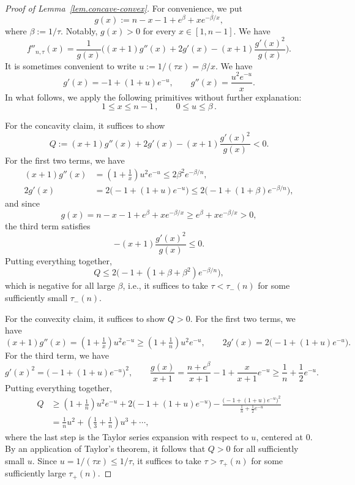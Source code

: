 \documentclass[10pt,a4paper]{amsart}
\begin{document}
\begin{proof}[Proof of Lemma~\ref{lem.concave-convex}]
For convenience, we put
\[
g(x)
:=n-x-1+e^{\beta}+xe^{-\beta/x},
\]
where $\beta:=1/\tau$.
Notably, $g(x)>0$ for every $x\in[1,n-1]$.
We have
\[
f''_{n,\tau}(x)
=\frac{1}{g(x)}\bigg((x+1)g''(x)+2g'(x)-(x+1)\frac{g'(x)^2}{g(x)}\bigg).
\]
It is sometimes convenient to write $u:=1/(\tau x)=\beta/x$.
We have
\[
g'(x)
=-1+(1+u)e^{-u},
\qquad
g''(x)
=\frac{u^2e^{-u}}{x}.
\]
In what follows, we apply the following primitives without further explanation:
\[
1\leq x\leq n-1\,,
\qquad
0\leq u\leq \beta\,.
\]

For the concavity claim, it suffices to show
\[
Q
:=(x+1)g''(x)+2g'(x)-(x+1)\frac{g'(x)^2}{g(x)}
<0.
\]
For the first two terms, we have
\begin{align*}
(x+1)g''(x)
&=(1+\tfrac{1}{x})u^2e^{-u}
\leq 2\beta^2e^{-\beta/n},\\[0.5em]
2g'(x)
&=2\big(-1+(1+u)e^{-u}\big)
\leq2\big(-1+(1+\beta)e^{-\beta/n}\big),
\end{align*}
and since
\[
g(x)
=n-x-1+e^{\beta}+xe^{-\beta/x}
\geq e^{\beta}+xe^{-\beta/x}
> 0,
\]
the third term satisfies
\[
-(x+1)\frac{g'(x)^2}{g(x)}
\leq0.
\]
Putting everything together,
\[
Q
\leq 2\big(-1+(1+\beta+\beta^2)e^{-\beta/n}\big),
\]
which is negative for all large $\beta$, i.e., it suffices to take $\tau<\tau_-(n)$ for some sufficiently small $\tau_-(n)$.

For the convexity claim, it suffices to show $Q>0$.
For the first two terms, we have
\[
(x+1)g''(x)
=(1+\tfrac{1}{x})u^2e^{-u}
\geq(1+\tfrac{1}{n})u^2e^{-u},
\qquad
2g'(x)
=2\big(-1+(1+u)e^{-u}\big).
\]
For the third term, we have
\[
g'(x)^2
=\big(-1+(1+u)e^{-u}\big)^2,
\qquad
\frac{g(x)}{x+1}
=\frac{n+e^\beta}{x+1}-1+\frac{x}{x+1}e^{-u}
\geq\frac{1}{n}+\frac{1}{2}e^{-u}.
\]
Putting everything together,
\begin{align*}
Q
&\geq(1+\tfrac{1}{n})u^2e^{-u}+2\big(-1+(1+u)e^{-u}\big)-\frac{\big(-1+(1+u)e^{-u}\big)^2}{\frac{1}{n}+\frac{1}{2}e^{-u}}\\
&=\tfrac{1}{n}u^2+(\tfrac{1}{3}+\tfrac{1}{n})u^3+\cdots,
\end{align*}
where the last step is the Taylor series expansion with respect to $u$, centered at $0$.
By an application of Taylor's theorem, it follows that $Q>0$ for all sufficiently small $u$.
Since $u=1/(\tau x)\leq 1/\tau$, it suffices to take $\tau>\tau_+(n)$ for some sufficiently large $\tau_+(n)$.
\end{proof}
\end{document}
